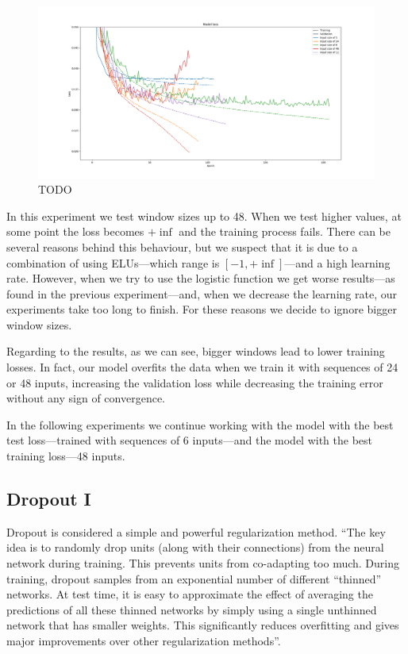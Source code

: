 \documentclass[]{article}
\begin{document}
\begin{figure}[H]
	\centering
	\includegraphics[width=\textwidth]{window}
	\caption{TODO}
	\label{f:window}
\end{figure}

In this experiment we test window sizes up to 48. When we test higher values, at some point the loss becomes $ +\inf $ and the training process fails. There can be several reasons behind this behaviour, but we suspect that it is due to a combination of using ELUs---which range is $ [-1, +\inf] $---and a high learning rate. However, when we try to use the logistic function we get worse results---as found in the previous experiment---and, when we decrease the learning rate, our experiments take too long to finish. For these reasons we decide to ignore bigger window sizes.

Regarding to the results, as we can see, bigger windows lead to lower training losses. In fact, our model overfits the data when we train it with sequences of 24 or 48 inputs, increasing the validation loss while decreasing the training error without any sign of convergence.

In the following experiments we continue working with the model with the best test loss---trained with sequences of 6 inputs---and the model with the best training loss---48 inputs.

\subsection{Dropout I}

Dropout is considered a simple and powerful regularization method. \cite{srivastava2014dropout} ``The key idea is to randomly drop units (along with their connections) from the neural network during training. This prevents units from co-adapting too much. During training, dropout samples from an exponential number of different ``thinned'' networks. At test time, it is easy to approximate the effect of averaging the predictions of all these thinned networks by simply using a single unthinned network that has smaller weights. This significantly reduces overfitting and gives major improvements over other regularization methods''.
\end{document}
